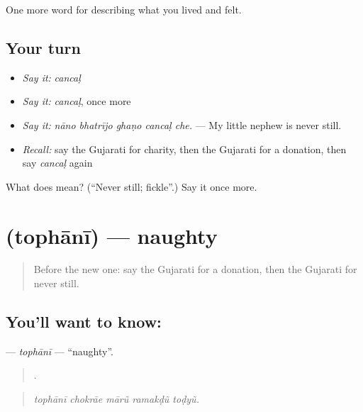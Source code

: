 \begin{grammarlens}[title={What you've built}]
One more word for describing what you lived and felt.
\end{grammarlens}

\subsection*{Your turn}
\begin{itemize}
\raggedright
  \item \emph{Say it:} \emph{cancaḷ}
  \item \emph{Say it:} \emph{cancaḷ}, once more
  \item \emph{Say it:} \emph{nāno bhatrījo ghaṇo cancaḷ che.} — My little nephew is never still.
  \item \emph{Recall:} say the Gujarati for charity, then the Gujarati for a donation, then say \emph{cancaḷ} again
\end{itemize}

\begin{tcolorbox}[breakable,colback=teal!4,colframe=teal!35!black,title={Before you move on}]
What does  mean? (\textquotedblleft{}Never still; fickle\textquotedblright{}.) Say it once more.
\end{tcolorbox}
\section[\texorpdfstring{\gu{તોફાની} (tophānī)}{તોફાની (tophānī)}]{ (tophānī) — naughty}

\label{lesson:GU-C462-tophani}



\begin{quote}
Before the new one: say the Gujarati for a donation, then the Gujarati for never still.
\end{quote}

\subsection*{You'll want to know: }
\textbf{} — \emph{tophānī} — \textquotedblleft{}naughty\textquotedblright{}.

\begin{quote}
    .
\end{quote}

\begin{quote}
\emph{tophānī chokrāe mārũ ramakḍũ toḍyũ.}
\end{quote}

